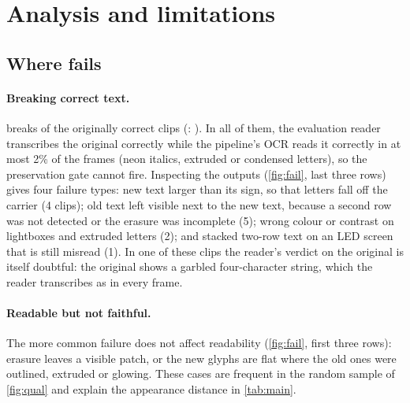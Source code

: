 \section{Analysis and limitations}
\label{sec:analysis}



\subsection{Where \method fails}
\label{sec:failures}
\paragraph{Breaking correct text.} \method breaks \rOursBroken{} of the \rOrigCorrect{} originally correct clips (\steer: \rSteerBroken). In all of them, the evaluation reader transcribes the original correctly while the pipeline's OCR reads it correctly in at most 2\% of the frames (neon italics, extruded or condensed letters), so the preservation gate cannot fire. Inspecting the outputs (\cref{fig:fail}, last three rows) gives four failure types: new text larger than its sign, so that letters fall off the carrier (4 clips); old text left visible next to the new text, because a second row was not detected or the erasure was incomplete (5); wrong colour or contrast on lightboxes and extruded letters (2); and stacked two-row text on an LED screen that is still misread (1). In one of these clips the reader's verdict on the original is itself doubtful: the original shows a garbled four-character string, which the reader transcribes as  in every frame.

\paragraph{Readable but not faithful.} The more common failure does not affect readability (\cref{fig:fail}, first three rows): erasure leaves a visible patch, or the new glyphs are flat where the old ones were outlined, extruded or glowing. These cases are frequent in the random sample of \cref{fig:qual} and explain the appearance distance in \cref{tab:main}.

